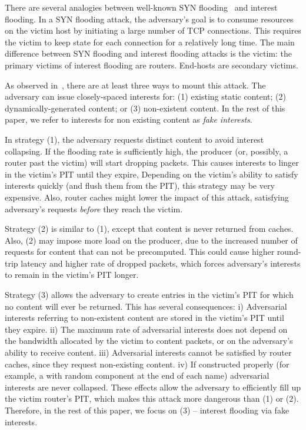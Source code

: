 \documentclass[10pt,conference,letterpaper]{IEEEtran}
\begin{document}
There are several analogies between well-known SYN flooding~\cite{Wang02detectingsyn} and 
interest flooding. In a SYN flooding attack, the adversary's goal is to consume resources on 
the victim host by initiating a large number of TCP connections. This requires the victim to 
keep state for each connection for a relatively long time.
The main difference between SYN flooding and interest flooding attacks is the victim: the 
primary victims of interest flooding are routers. End-hosts are secondary victims.

As observed in~\cite{ndn-dos}, there are at least three ways to mount this attack. 
The adversary can issue closely-spaced interests for:
(1) existing static content;
(2) dynamically-generated content; or
(3) non-existent content.
In the rest of this paper, we refer to interests for non existing content as {\em fake 
interests}.

In strategy (1), the adversary requests distinct content to avoid interest collapsing.  
If the flooding rate is sufficiently high, the producer (or, possibly, a router 
past the victim) will start dropping packets. This causes interests to linger in the 
victim's PIT until they expire, 
Depending on the victim's ability to satisfy interests 
quickly (and flush them from the PIT), this strategy may be very expensive.
Also, router caches might lower the impact of this attack, satisfying 
adversary's requests {\em before} they reach the victim. 

Strategy (2) is similar to (1), except that content is never returned from caches. Also, 
(2) may impose more load on the producer, due to the increased number of requests 
for content that can not be precomputed. This could cause higher round-trip latency 
and higher rate of dropped packets, which forces adversary's interests to 
remain in the victim's PIT longer.

Strategy (3) allows the adversary to create entries in the victim's PIT 
for which no content will ever be returned. This has several consequences: i) Adversarial interests referring to non-existent content 
are stored in the victim's PIT until they expire.
ii) The maximum rate of adversarial interests does not depend on the 
bandwidth allocated by the victim to content packets, or on the adversary's 
ability to receive content.
iii) Adversarial interests cannot be satisfied by router caches, since they 
request non-existing content.
iv) If constructed properly (for example, a with random component 
at the end of each name) adversarial interests are never collapsed. 
These effects allow the adversary to efficiently fill up the victim router's PIT, 
which makes this attack more dangerous than (1) or (2).
Therefore, in the rest of this paper, we  focus on  (3) -- interest flooding via
fake interests.
\end{document}

